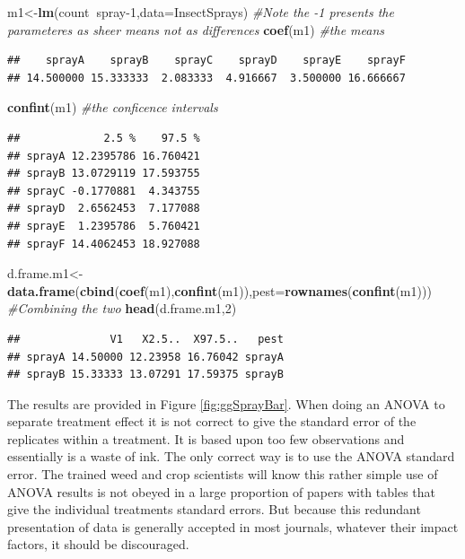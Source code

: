 \documentclass[letterpaper,]{book}
\newenvironment{Shaded}{\begin{snugshade}}{\end{snugshade}}
\newcommand{\CommentTok}[1]{\textcolor[rgb]{0.56,0.35,0.01}{\textit{#1}}}
\newcommand{\DataTypeTok}[1]{\textcolor[rgb]{0.13,0.29,0.53}{#1}}
\newcommand{\DecValTok}[1]{\textcolor[rgb]{0.00,0.00,0.81}{#1}}
\newcommand{\KeywordTok}[1]{\textcolor[rgb]{0.13,0.29,0.53}{\textbf{#1}}}
\newcommand{\NormalTok}[1]{#1}
\newcommand{\OperatorTok}[1]{\textcolor[rgb]{0.81,0.36,0.00}{\textbf{#1}}}
\begin{document}
\begin{Shaded}
\begin{Highlighting}[]
\NormalTok{m1<-}\KeywordTok{lm}\NormalTok{(count}\OperatorTok{~}\NormalTok{spray}\DecValTok{-1}\NormalTok{,}\DataTypeTok{data=}\NormalTok{InsectSprays)}
\CommentTok{#Note the -1 presents the parameteres as sheer means not as differences }
\KeywordTok{coef}\NormalTok{(m1) }\CommentTok{#the means}
\end{Highlighting}
\end{Shaded}

\begin{verbatim}
##    sprayA    sprayB    sprayC    sprayD    sprayE    sprayF 
## 14.500000 15.333333  2.083333  4.916667  3.500000 16.666667
\end{verbatim}

\begin{Shaded}
\begin{Highlighting}[]
\KeywordTok{confint}\NormalTok{(m1) }\CommentTok{#the conficence intervals}
\end{Highlighting}
\end{Shaded}

\begin{verbatim}
##             2.5 %    97.5 %
## sprayA 12.2395786 16.760421
## sprayB 13.0729119 17.593755
## sprayC -0.1770881  4.343755
## sprayD  2.6562453  7.177088
## sprayE  1.2395786  5.760421
## sprayF 14.4062453 18.927088
\end{verbatim}

\begin{Shaded}
\begin{Highlighting}[]
\NormalTok{d.frame.m1<-}\KeywordTok{data.frame}\NormalTok{(}\KeywordTok{cbind}\NormalTok{(}\KeywordTok{coef}\NormalTok{(m1),}\KeywordTok{confint}\NormalTok{(m1)),}\DataTypeTok{pest=}\KeywordTok{rownames}\NormalTok{(}\KeywordTok{confint}\NormalTok{(m1))) }\CommentTok{#Combining the two}
\KeywordTok{head}\NormalTok{(d.frame.m1,}\DecValTok{2}\NormalTok{)}
\end{Highlighting}
\end{Shaded}

\begin{verbatim}
##              V1   X2.5..  X97.5..   pest
## sprayA 14.50000 12.23958 16.76042 sprayA
## sprayB 15.33333 13.07291 17.59375 sprayB
\end{verbatim}

The results are provided in Figure \ref{fig:ggSprayBar}. When doing an ANOVA to separate treatment effect it is not correct to give the standard error of the replicates within a treatment. It is based upon too few observations and essentially is a waste of ink. The only correct way is to use the ANOVA standard error. The trained weed and crop scientists will know this rather simple use of ANOVA results is not obeyed in a large proportion of papers with tables that give the individual treatments standard errors. But because this redundant presentation of data is generally accepted in most journals, whatever their impact factors, it should be discouraged.
\end{document}

